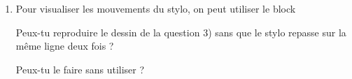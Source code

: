 \documentclass[a4paper,11pt]{article}
\begin{document}
\begin{enumerate}[1)]
	\item Pour visualiser les mouvements du stylo, on peut utiliser le block


	      Peux-tu reproduire le dessin de la question 3) sans que le stylo repasse sur la même ligne deux fois ?

	      Peux-tu le faire sans utiliser  ?
\end{enumerate}
\end{document}
